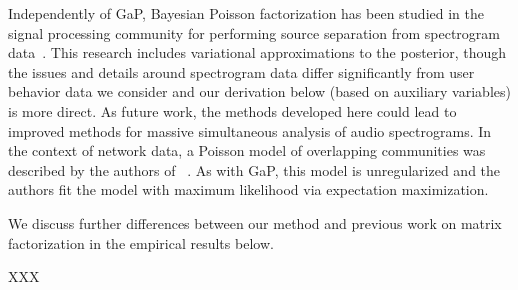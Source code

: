 Independently of GaP, Bayesian Poisson factorization has been studied
in the signal processing community for performing source separation
from spectrogram data~\cite{Cemgil:2009,Hoffman:2012}.  This research
includes variational approximations to the posterior, though the
issues and details around spectrogram data differ significantly from
user behavior data we consider and our derivation below (based on
auxiliary variables) is more direct.  As future work, the methods
developed here could lead to improved methods for massive simultaneous
analysis of audio spectrograms. In the context of network data, a
Poisson model of overlapping communities was described by the authors
of ~\cite{Ball:2011}.  As with GaP, this model is unregularized and
the authors fit the model with maximum likelihood via expectation
maximization. 


We discuss further differences between our method and previous work on
matrix factorization in the empirical results below.

XXX \cite{Marlin:2009,Marlin:2012,Elkan:2008,Ma:2011}
